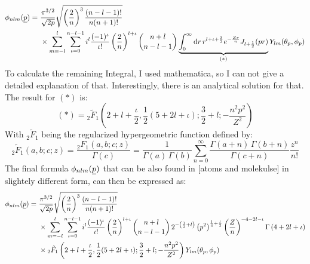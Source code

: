 \begin{align*}
    \phi_{nlm}(\underline{p}) =\ & \frac{\pi^{3/2}}{\sqrt{2p}}\sqrt{\left(\frac{2}{n}\right)^3\frac{(n-l-1)!}{n(n+1)!}}\\
    & \times \sum_{m=-l}^{l}\sum_{\iota=0}^{n-l-1}i^l\frac{(-1)^{\iota}}{\iota!}\left(\frac{2}{n}\right)^{l+\iota}\binom{n+l}{n-l-1}\underbrace{\int_{0}^{\infty}\mathrm{d} r\,r^{l+\iota+\frac{3}{2}}e^{-\frac{Zr}{n}}J_{l+\frac{1}{2}}(pr)}_{(*)} Y_{lm}(\theta_p,\phi_p)
\end{align*}
To calculate the remaining Integral, I used mathematica, so I can not give a detailed explanation of that. Interestingly, there is an analytical solution for that. 
The result for $(*)$ is:
\begin{equation}
    (*) = {}_2\tilde{F}_1\left(2 + l + \frac{\iota}{2}, \frac{1}{2}(5 + 2l + \iota); \frac{3}{2} + l; -\frac{n^2 p^2}{Z^2}\right)
\end{equation}
With ${}_2\tilde{F}_1$ being the regularized hypergeometric function defined by:
\begin{equation*}
    {}_2\tilde{F}_1(a,b;c;z) = \frac{{}_2F_1(a,b;c;z)}{\Gamma(c)} = \frac{1}{\Gamma(a)\,\Gamma(b)} \sum_{n=0}^{\infty} \frac{\Gamma(a+n)\,\Gamma(b+n)}{\Gamma(c+n)} \frac{z^n}{n!}
\end{equation*}
The final formula $\phi_{nlm}(\underline{p})$ that can be also found in [atoms and molekulse] in slightely different form, can then be expressed as:
\begin{align}
    \phi_{nlm}(\underline{p}) =\ & \frac{\pi^{3/2}}{\sqrt{2p}}\sqrt{\left(\frac{2}{n}\right)^3\frac{(n-l-1)!}{n(n+1)!}}\\
    & \times \sum_{m=-l}^{l}\sum_{\iota=0}^{n-l-1}i^l\frac{(-1)^{\iota}}{\iota!}\left(\frac{2}{n}\right)^{l+\iota}\binom{n+l}{n-l-1}\,2^{-\left(\frac{1}{2} + l\right)} \left(p^2\right)^{\frac{1}{4} + \frac{l}{2}} \left(\frac{Z}{n}\right)^{-4 - 2l - \iota} \Gamma\left(4 + 2l + \iota\right)\\ 
    & \times {}_2\tilde{F}_1\left(2 + l + \frac{\iota}{2}, \frac{1}{2}(5 + 2l + \iota); \frac{3}{2} + l; -\frac{n^2 p^2}{Z^2}\right) Y_{lm}(\theta_p,\phi_p)
\end{align}










